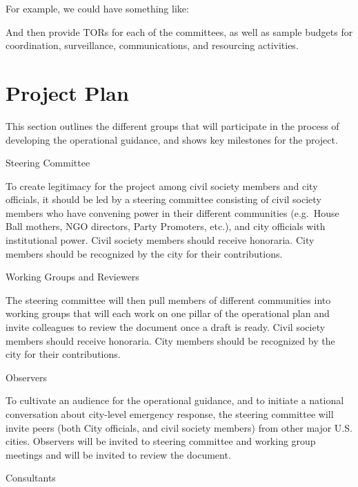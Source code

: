 \documentclass[
  letterpaper,
  DIV=11,
  numbers=noendperiod,
  oneside]{scrreprt}
\begin{document}
\hfill\break

For example, we could have something like:

\hfill\break

And then provide TORs for each of the committees, as well as sample
budgets for coordination, surveillance, communications, and resourcing
activities.

\hypertarget{project-plan}{%
\chapter{Project Plan}\label{project-plan}}

\hfill\break

This section outlines the different groups that will participate in the
process of developing the operational guidance, and shows key milestones
for the project.

\hfill\break

Steering Committee

To create legitimacy for the project among civil society members and
city officials, it should be led by a steering committee consisting of
civil society members who have convening power in their different
communities (e.g.~House Ball mothers, NGO directors, Party Promoters,
etc.), and city officials with institutional power. Civil society
members should receive honoraria. City members should be recognized by
the city for their contributions.

\hfill\break

Working Groups and Reviewers

The steering committee will then pull members of different communities
into working groups that will each work on one pillar of the operational
plan and invite colleagues to review the document once a draft is ready.
Civil society members should receive honoraria. City members should be
recognized by the city for their contributions.

\hfill\break

Observers

To cultivate an audience for the operational guidance, and to initiate a
national conversation about city-level emergency response, the steering
committee will invite peers (both City officials, and civil society
members) from other major U.S. cities. Observers will be invited to
steering committee and working group meetings and will be invited to
review the document.~

\hfill\break

Consultants
\end{document}
